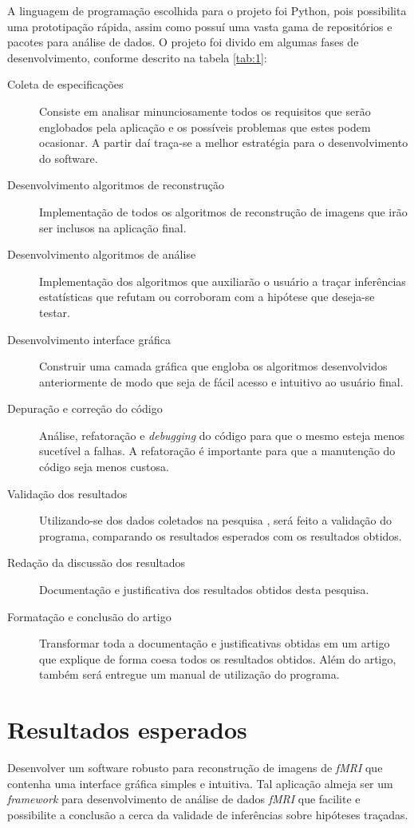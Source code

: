 \documentclass[11pt,a4paper]{report}
\begin{document}
A linguagem de programação escolhida para o projeto foi Python, pois possibilita uma prototipação rápida, assim como possuí uma vasta gama de repositórios e pacotes para análise de dados. O projeto foi divido em algumas fases de desenvolvimento, conforme descrito na tabela \ref{tab:1}:
\begin{description}
  \item [Coleta de especificações] Consiste em analisar minunciosamente todos os requisitos que serão englobados pela aplicação e os possíveis problemas que estes podem ocasionar. A partir daí traça-se a melhor estratégia para o desenvolvimento do software. 
  \item [Desenvolvimento algoritmos de reconstrução] Implementação de todos os algoritmos de reconstrução de imagens que irão ser inclusos na aplicação final.
  \item [Desenvolvimento algoritmos de análise] Implementação dos algoritmos que auxiliarão o usuário a traçar inferências estatísticas que refutam ou corroboram com a hipótese que deseja-se testar.
  \item [Desenvolvimento interface gráfica] Construir uma camada gráfica que engloba os algoritmos desenvolvidos anteriormente de modo que seja de fácil acesso e intuitivo ao usuário final.
  \item [Depuração e correção do código] Análise, refatoração e \emph{debugging} do código para que o mesmo esteja menos sucetível a falhas. A refatoração é importante para que a manutenção do código seja menos custosa.
  \item [Validação dos resultados] Utilizando-se dos dados coletados na pesquisa \cite{Santos2017}, será feito a validação do programa, comparando os resultados esperados com os resultados obtidos. 
  \item [Redação da discussão dos resultados] Documentação e justificativa dos resultados obtidos desta pesquisa.
  \item [Formatação e conclusão do artigo]  Transformar toda a documentação e justificativas obtidas em um artigo que explique de forma coesa todos os resultados obtidos. Além do artigo, também será entregue um manual de utilização do programa.
\end{description}
\section*{Resultados esperados}
Desenvolver um software robusto para reconstrução de imagens de \emph{fMRI} que contenha uma interface gráfica simples e intuitiva. Tal aplicação almeja ser um \emph{framework} para desenvolvimento de análise de dados \emph{fMRI} que facilite e possibilite a conclusão a cerca da validade de inferências sobre hipóteses traçadas.




\end{document}
